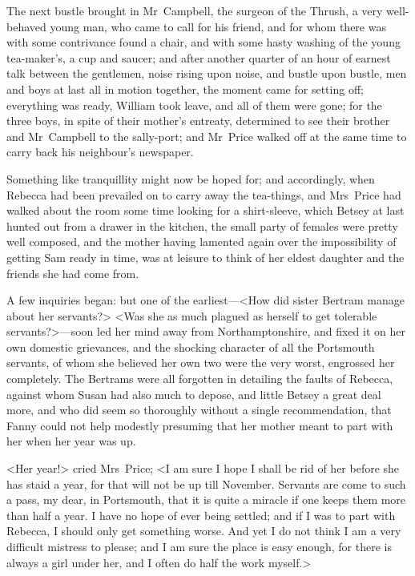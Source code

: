 The next bustle brought in Mr~Campbell, the surgeon of the Thrush, a very well-behaved young man, who came to call for his friend, and for whom there was with some contrivance found a chair, and with some hasty washing of the young tea-maker's, a cup and saucer; and after another quarter of an hour of earnest talk between the gentlemen, noise rising upon noise, and bustle upon bustle, men and boys at last all in motion together, the moment came for setting off; everything was ready, William took leave, and all of them were gone; for the three boys, in spite of their mother's entreaty, determined to see their brother and Mr~Campbell to the sally-port; and Mr~Price walked off at the same time to carry back his neighbour's newspaper.

Something like tranquillity might now be hoped for; and accordingly, when Rebecca had been prevailed on to carry away the tea-things, and Mrs~Price had walked about the room some time looking for a shirt-sleeve, which Betsey at last hunted out from a drawer in the kitchen, the small party of females were pretty well composed, and the mother having lamented again over the impossibility of getting Sam ready in time, was at leisure to think of her eldest daughter and the friends she had come from.

A few inquiries began: but one of the earliest—<How did sister Bertram manage about her servants?> <Was she as much plagued as herself to get tolerable servants?>—soon led her mind away from Northamptonshire, and fixed it on her own domestic grievances, and the shocking character of all the Portsmouth servants, of whom she believed her own two were the very worst, engrossed her completely. The Bertrams were all forgotten in detailing the faults of Rebecca, against whom Susan had also much to depose, and little Betsey a great deal more, and who did seem so thoroughly without a single recommendation, that Fanny could not help modestly presuming that her mother meant to part with her when her year was up.

<Her year!> cried Mrs~Price; <I am sure I hope I shall be rid of her before she has staid a year, for that will not be up till November. Servants are come to such a pass, my dear, in Portsmouth, that it is quite a miracle if one keeps them more than half a year. I have no hope of ever being settled; and if I was to part with Rebecca, I should only get something worse. And yet I do not think I am a very difficult mistress to please; and I am sure the place is easy enough, for there is always a girl under her, and I often do half the work myself.>

